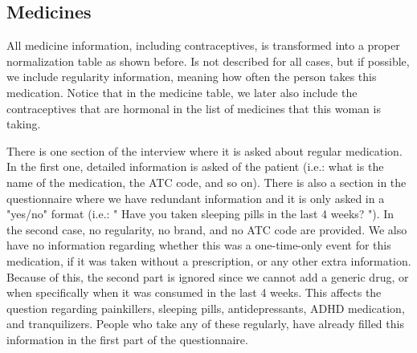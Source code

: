 

		 										
            

    



\subsection{Medicines}

All medicine information, including contraceptives, is transformed into a proper normalization table as shown before. Is not described for all cases, but if possible, we include regularity information, meaning how often the person takes this medication. Notice that in the medicine table, we later also include the contraceptives that are hormonal in the list of medicines that this woman is taking.

There is one section of the interview where it is asked about regular medication. In the first one, detailed information is asked of the patient (i.e.: what is the name of the medication, the ATC code, and so on). There is also a section in the questionnaire where we have redundant information and it is only asked in a "yes/no" format (i.e.: " Have you taken sleeping pills in the last 4 weeks? "). In the second case, no regularity, no brand, and no ATC code are provided. We also have no information regarding whether this was a one-time-only event for this medication, if it was taken without a prescription, or any other extra information.  Because of this, the second part is ignored since we cannot add a generic drug, or when specifically when it was consumed in the last 4 weeks. This affects the question regarding painkillers, sleeping pills, antidepressants, ADHD medication, and tranquilizers. People who take any of these regularly, have already filled this information in the first part of the questionnaire.

